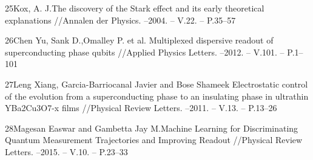 	25\quad Kox, A. J.The discovery of the Stark effect and its early theoretical explanations //Annalen der Physics. --2004. -- V.22. -- P.35--57
	
	26\quad Chen Yu, Sank D.,Omalley P. et al. Multiplexed dispersive readout of superconducting phase qubits //Applied Physics Letters. --2012. -- V.101. -- P.1--101
	
	27\quad Leng Xiang, Garcia-Barriocanal Javier and Bose Shameek Electrostatic control of the evolution from a superconducting phase to an insulating phase in ultrathin YBa2Cu3O7-x films //Physical Review Letters. --2011. -- V.13. -- P.13--26
	
	28\quad Magesan Easwar and Gambetta Jay M.Machine Learning for Discriminating Quantum Measurement Trajectories and Improving Readout //Physical Review Letters. --2015. -- V.10. -- P.23--33